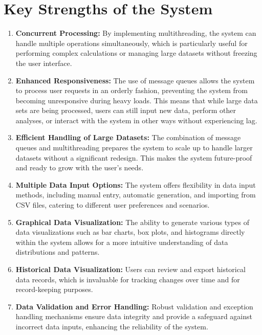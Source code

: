 \documentclass[english,12pt,a4paper]{report}
\begin{document}
	\section{Key Strengths of the System}
	\begin{enumerate}
		\item \textbf{Concurrent Processing:} By implementing multithreading, the system can handle multiple operations simultaneously, which is particularly useful for performing complex calculations or managing large datasets without freezing the user interface.
		
		\item \textbf{Enhanced Responsiveness:} The use of message queues allows the system to process user requests in an orderly fashion, preventing the system from becoming unresponsive during heavy loads. This means that while large data sets are being processed, users can still input new data, perform other analyses, or interact with the system in other ways without experiencing lag.
		
		\item \textbf{Efficient Handling of Large Datasets:} The combination of message queues and multithreading prepares the system to scale up to handle larger datasets without a significant redesign. This makes the system future-proof and ready to grow with the user's needs.
		
		\item \textbf{Multiple Data Input Options:} The system offers flexibility in data input methods, including manual entry, automatic generation, and importing from CSV files, catering to different user preferences and scenarios.
		
		\item \textbf{Graphical Data Visualization:} The ability to generate various types of data visualizations such as bar charts, box plots, and histograms directly within the system allows for a more intuitive understanding of data distributions and patterns.
		
		\item \textbf{Historical Data Visualization:} Users can review and export historical data records, which is invaluable for tracking changes over time and for record-keeping purposes.
		
		\item \textbf{Data Validation and Error Handling:} Robust validation and exception handling mechanisms ensure data integrity and provide a safeguard against incorrect data inputs, enhancing the reliability of the system.
	\end{enumerate}
	
\end{document}
